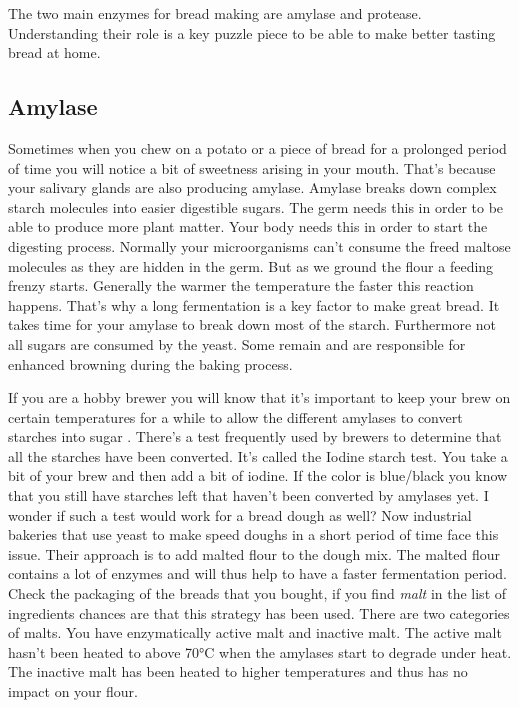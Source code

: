 The two main enzymes for bread making are amylase and protease.
Understanding their role is a key puzzle piece to be able
to make better tasting bread at home.

\subsection{Amylase}

Sometimes when you chew on a potato or a piece of bread
for a prolonged period of time you will notice a bit of sweetness
arising in your mouth. That's because your salivary glands
are also producing amylase. Amylase breaks down complex
starch molecules into easier digestible sugars. The germ
needs this in order to be able to produce more plant matter.
Your body needs this in order to start the digesting process.
Normally your microorganisms can't consume the freed maltose molecules
as they are hidden in the germ. But as we ground the flour
a feeding frenzy starts. Generally the warmer the temperature
the faster this reaction happens. That's why a long fermentation
is a key factor to make great bread. It takes time
for your amylase to break down most of the starch. Furthermore
not all sugars are consumed by the yeast. Some remain and
are responsible for enhanced browning during the baking
process.

If you are a hobby brewer you will know that it's
important to keep your brew on certain temperatures for a
while to allow the different amylases to convert starches
into sugar \cite{beer+amylase}. There's a test frequently used by brewers
to determine that all the starches have been converted.
It's called the Iodine starch test. You take a bit of your brew
and then add a bit of iodine. If the color is blue/black
you know that you still have starches left that haven't been
converted by amylases yet. I wonder if such a test would work
for a bread dough as well? Now industrial bakeries
that use yeast to make speed doughs in a short period of
time face this issue. Their approach is to add malted
flour to the dough mix. The malted flour contains a lot
of enzymes and will thus help to have a faster fermentation
period. Check the packaging of the breads that you bought,
if you find {\it malt} in the list of ingredients chances
are that this strategy has been used. There are two categories
of malts. You have enzymatically active malt and inactive
malt. The active malt hasn't been heated to above 70°C
when the amylases start to degrade under heat. The inactive
malt has been heated to higher temperatures and thus
has no impact on your flour.

